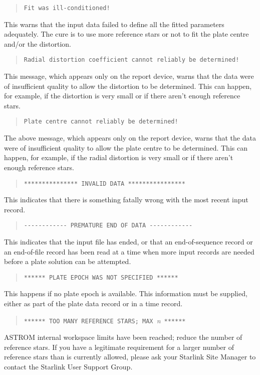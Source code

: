 \begin{quote}
\verb|Fit was ill-conditioned!|
\end{quote}
This warns that the input data failed to
define all the fitted parameters adequately.  The cure is to
use more reference stars or not to fit the plate centre
and/or the distortion.

\begin{quote}
\verb|Radial distortion coefficient cannot reliably be determined!|
\end{quote}
This message, which appears only on the report device, warns that
the data were of insufficient quality to allow the distortion
to be determined.  This can happen, for example, if the
distortion is very small or if there aren't enough reference stars.

\begin{quote}
\verb|Plate centre cannot reliably be determined!|
\end{quote}
The above message, which appears only on the report device, warns that
the data were of insufficient quality to allow the plate
centre to be determined.  This can happen, for example, if the
radial distortion is very small or if there aren't enough reference stars.

\begin{quote}
\verb|*************** INVALID DATA ****************|
\end{quote}
This indicates that there is something fatally wrong with the
most recent input record.

\begin{quote}
\verb|------------ PREMATURE END OF DATA ------------|
\end{quote}
This indicates that the input file has ended, or that an
end-of-sequence record or an end-of-file record has been read at a time
when more input records are needed before a plate solution can be
attempted.

\begin{quote}
\verb|****** PLATE EPOCH WAS NOT SPECIFIED ******|
\end{quote}
This happens if no plate epoch is available.  This
information must be supplied, either as part of the plate data record or
in a time record.

\begin{quote}
\verb|****** TOO MANY REFERENCE STARS; MAX |{\it n}\ \verb|******|
\end{quote}
ASTROM internal workspace limits have been reached;  reduce the
number of reference stars.  If you have a legitimate requirement
for a larger number of reference stars than is currently allowed,
please ask your Starlink Site Manager to contact the Starlink
User Support Group.

